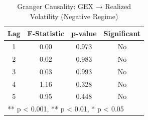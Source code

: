 \begin{table}[htbp]
\centering
\caption{Granger Causality: GEX → Realized Volatility (Negative Regime)}
\label{tab:granger_neg}
\begin{tabular}{cccc}
\toprule
Lag & F-Statistic & p-value & Significant \\
\midrule
1 & 0.00 & 0.973 & No \\
2 & 0.02 & 0.983 & No \\
3 & 0.03 & 0.993 & No \\
4 & 1.16 & 0.328 & No \\
5 & 0.95 & 0.448 & No \\
\bottomrule
\multicolumn{4}{l}{\footnotesize *** p < 0.001, ** p < 0.01, * p < 0.05}
\end{tabular}
\end{table}
